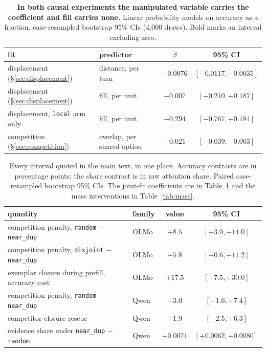 \documentclass{article}
\begin{document}
\begin{table}[H]
  \centering\small
  \caption{\textbf{In both causal experiments the manipulated variable carries the
  coefficient and fill carries none.} Linear probability models on accuracy as a fraction,
  case-resampled bootstrap 95\% CIs (4{,}000 draws). Bold marks an interval excluding zero.}
  \label{tab:fits}
  \setlength{\tabcolsep}{5pt}
  \begin{tabular}{llcc}
    \toprule
    fit & predictor & $\beta$ & 95\% CI\\
    \midrule
    displacement (\S\ref{sec:displacement}) & distance, per turn & $\mathbf{-0.0076}$ & $[-0.0117,-0.0035]$\\
    displacement (\S\ref{sec:displacement}) & fill, per unit & $-0.007$ & $[-0.210,+0.187]$\\
    displacement, \texttt{local} arm only & fill, per unit & $-0.294$ & $[-0.767,+0.184]$\\
    competition (\S\ref{sec:competition}) & overlap, per shared option & $\mathbf{-0.021}$ & $[-0.039,-0.003]$\\
    \bottomrule
  \end{tabular}
\end{table}

\begin{table}[H]
  \centering\small
  \caption{Every interval quoted in the main text, in one place. Accuracy contrasts are in
  percentage points; the share contrast is in raw attention share. Paired case-resampled
  bootstrap 95\% CIs. The joint-fit coefficients are in Table~\ref{tab:fits} and the mass
  interventions in Table~\ref{tab:mass}.}
  \label{tab:intervals}
  \setlength{\tabcolsep}{5pt}
  \begin{tabular}{llcc}
    \toprule
    quantity & family & value & 95\% CI\\
    \midrule
    competition penalty, \texttt{random} $-$ \texttt{near\_dup} & OLMo & $+8.5$ & $[+3.0,+14.0]$\\
    competition penalty, \texttt{disjoint} $-$ \texttt{near\_dup} & OLMo & $+5.8$ & $[+0.6,+11.2]$\\
    exemplar closure during prefill, accuracy cost & OLMo & $+17.5$ & $[+7.5,+30.0]$\\
    competition penalty, \texttt{random} $-$ \texttt{near\_dup} & Qwen & $+3.0$ & $[-1.6,+7.4]$\\
    competitor closure rescue & Qwen & $+1.9$ & $[-2.5,+6.3]$\\
    evidence share under \texttt{near\_dup} $-$ \texttt{random} & Qwen & $+0.0071$ & $[+0.0062,+0.0080]$\\
    \bottomrule
  \end{tabular}
\end{table}
\end{document}
